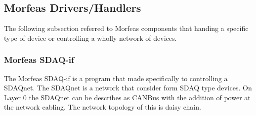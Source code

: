 \documentclass{article}
\begin{document}
\newpage
\subsection{Morfeas Drivers/Handlers}
The following subsection referred to Morfeas components that handing a specific type of device or controlling a wholly network of devices.
\subsubsection{Morfeas SDAQ-if}
The Morfeas SDAQ-if is a program that made specifically to controlling a SDAQnet. The SDAQnet is a network that consider form SDAQ type devices.
On Layer 0 the SDAQnet can be describes as CANBus with the addition of power at the network cabling. The network topology of this is daisy chain.
\end{document}

